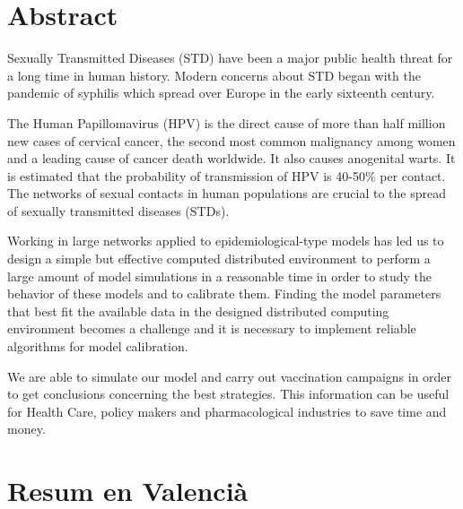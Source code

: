 
\chapter*{Abstract}
Sexually Transmitted Diseases (STD) have been a major public health threat for a long time in human history. Modern concerns about STD began with the pandemic of syphilis which spread over Europe in the early sixteenth century. 

The Human Papillomavirus (HPV) is the direct cause of more than half million new cases of cervical cancer, the second most common malignancy among women and a leading cause of cancer death worldwide. It also causes anogenital warts. It is estimated that the probability of transmission of HPV is 40-50\% per contact. The networks of sexual contacts in human populations are crucial to the spread of sexually transmitted diseases (STDs).

Working in large networks applied to epidemiological-type models has led us to design a simple but effective computed distributed environment to perform a large amount of model simulations in a reasonable time in order to study the behavior of these models and to calibrate them. Finding the model parameters that best fit the available data in the designed distributed computing environment becomes a challenge and it is necessary to implement reliable algorithms for model calibration.

We are able to simulate our model and carry out vaccination campaigns in order to get conclusions concerning the best strategies. This information can be useful for Health Care, policy makers and pharmacological industries to save time and money.


\chapter*{Resum en Valenci\`a}
